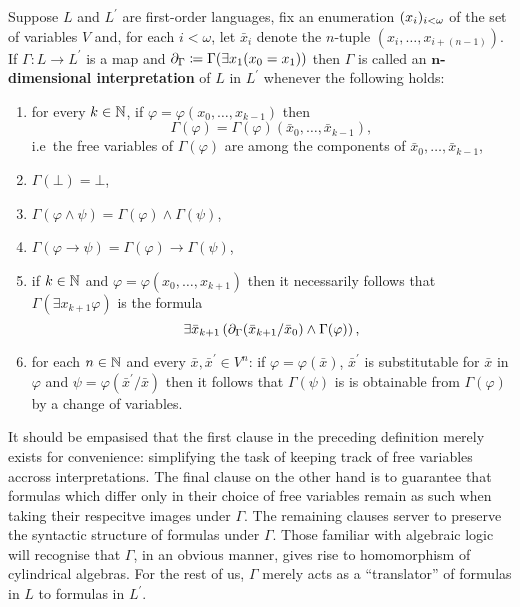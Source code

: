 \begin{dfn}[Interpretation]
	Suppose $L$ and $L^\prime$ are first-order languages, fix an enumeration $(x_i)_{i<\omega}$ of the set of variables $V$ and, for each $i<\omega$, let $\bar{x}_i$ denote the $n$-tuple $\left(x_i,\dotsc,x_{i+(n-1)}\right)$.  If $\Gamma\colon L\to L^\prime$ is a map and $\partial_\Gamma\coloneqq\Gamma(\exists x_1(x_0=x_1))$ then $\Gamma$ is called an $\mathbf{n}$\textbf{-dimensional interpretation} of $L$ in $L^\prime$ whenever the following holds:
	\begin{enumerate}
		\item	for every $k\in\mathbb{N}$, if $\varphi=\varphi(x_0,\dotsc,x_{k-1})$ then
			\begin{equation}
				\Gamma(\varphi)=\Gamma(\varphi)(\bar{x}_0,\dotsc,\bar{x}_{k-1}),
			\end{equation}
			i.e\ the free variables of $\Gamma(\varphi)$ are among the components of $\bar{x}_0,\dotsc,\bar{x}_{k-1}$,
		\item	$\Gamma(\bot)=\bot$,
		\item	$\Gamma(\varphi\wedge\psi)=\Gamma(\varphi)\wedge\Gamma(\psi)$,
		\item	$\Gamma(\varphi\rightarrow\psi)=\Gamma(\varphi)\rightarrow\Gamma(\psi)$,
		\item	if $k\in\mathbb{N}$ and $\varphi=\varphi(x_0,\dotsc,x_{k+1})$ then it necessarily follows that $\Gamma(\exists x_{k+1}\varphi)$ is the formula
			\begin{equation}
				\exists\bar{x}_{k+1}\left(\partial_\Gamma(\bar{x}_{k+1}/\bar{x}_0)\wedge\Gamma(\varphi)\right),
			\end{equation}
		\item	for each $n\in\mathbb{N}$ and every $\bar{x},\bar{x}^\prime\in V^n$: if $\varphi=\varphi(\bar{x})$, $\bar{x}^\prime$ is substitutable for $\bar{x}$ in $\varphi$ and $\psi=\varphi(\bar{x}^\prime/\bar{x})$ then it follows that $\Gamma(\psi)$ is is obtainable from $\Gamma(\varphi)$ by a change of variables.
	\end{enumerate}
\end{dfn}

It should be empasised that the first clause in the preceding definition merely exists for convenience: simplifying the task of keeping track of free variables accross interpretations.  The final clause on the other hand is to guarantee that formulas which differ only in their choice of free variables remain as such when taking their respecitve images under $\Gamma$.  The remaining clauses server to preserve the syntactic structure of formulas under $\Gamma$.  Those familiar with algebraic logic will recognise that $\Gamma$, in an obvious manner, gives rise to homomorphism of cylindrical algebras.  For the rest of us, $\Gamma$ merely acts as a ``translator'' of formulas in $L$ to formulas in $L^\prime$.

